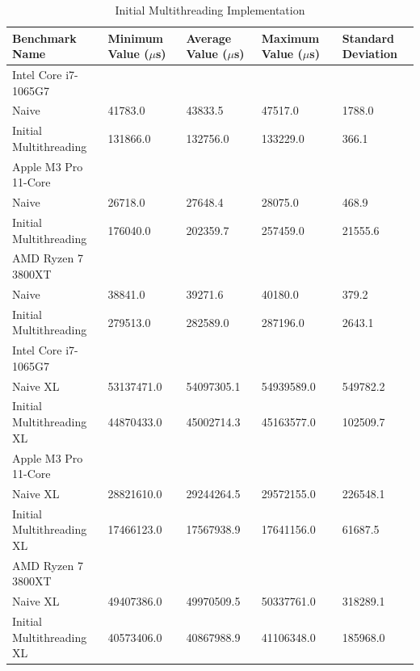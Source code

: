 \documentclass[modern,longauthor]{aastex7}
\begin{document}
\begin{table}[htb!]
\centering
\caption{Initial Multithreading Implementation\label{tab:initial_multithreading}}
\begin{tabular}{p{5cm} p{2cm} p{2cm} p{2cm} p{2cm}}
\hline
Benchmark Name & Minimum Value ($\mu$s) & Average Value ($\mu$s) & Maximum Value ($\mu$s) & Standard Deviation \\
\hline
Intel Core i7-1065G7 \\
\hspace{0.5cm}Naive & 41783.0 & 43833.5 & 47517.0 & 1788.0 \\
\hspace{0.5cm}Initial Multithreading & 131866.0 & 132756.0 & 133229.0 & 366.1 \\
Apple M3 Pro 11-Core \\
\hspace{0.5cm}Naive & 26718.0 & 27648.4 & 28075.0 & 468.9 \\
\hspace{0.5cm}Initial Multithreading & 176040.0 & 202359.7 & 257459.0 & 21555.6 \\
AMD Ryzen 7 3800XT \\
\hspace{0.5cm}Naive & 38841.0 & 39271.6 & 40180.0 & 379.2 \\
\hspace{0.5cm}Initial Multithreading & 279513.0 & 282589.0 & 287196.0 & 2643.1 \\
\hline
Intel Core i7-1065G7 \\
\hspace{0.5cm}Naive XL & 53137471.0 & 54097305.1 & 54939589.0 & 549782.2 \\
\hspace{0.5cm}Initial Multithreading XL & 44870433.0 & 45002714.3 & 45163577.0 & 102509.7 \\
Apple M3 Pro 11-Core \\
\hspace{0.5cm}Naive XL & 28821610.0 & 29244264.5 & 29572155.0 & 226548.1 \\
\hspace{0.5cm}Initial Multithreading XL & 17466123.0 & 17567938.9 & 17641156.0 & 61687.5 \\
AMD Ryzen 7 3800XT \\
\hspace{0.5cm}Naive XL & 49407386.0 & 49970509.5 & 50337761.0 & 318289.1 \\
\hspace{0.5cm}Initial Multithreading XL & 40573406.0 & 40867988.9 & 41106348.0 & 185968.0 \\
\hline
\end{tabular}
\end{table}
\FloatBarrier
\end{document}
